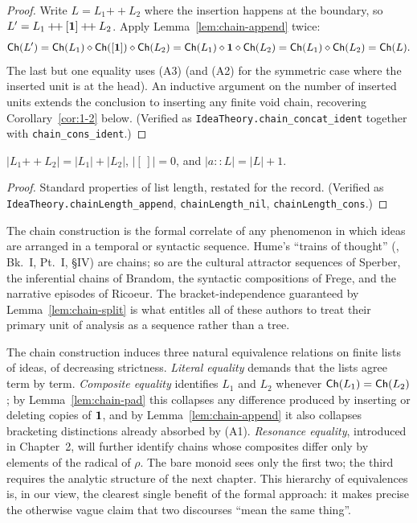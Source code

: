 \begin{proof}
Write $L = L_1 \mathbin{+\!+} L_2$ where the insertion happens at the
boundary, so $L' = L_1 \mathbin{+\!+} [\mathbf{1}] \mathbin{+\!+} L_2$.  Apply
Lemma~\ref{lem:chain-append} twice:
\[
\mathsf{Ch}(L') = \mathsf{Ch}(L_1) \mathbin{\diamond} \mathsf{Ch}([\mathbf{1}]) \mathbin{\diamond} \mathsf{Ch}(L_2)
= \mathsf{Ch}(L_1) \mathbin{\diamond} \mathbf{1} \mathbin{\diamond} \mathsf{Ch}(L_2)
= \mathsf{Ch}(L_1) \mathbin{\diamond} \mathsf{Ch}(L_2) = \mathsf{Ch}(L).
\]
The last but one equality uses (A3) (and (A2) for the symmetric case
where the inserted unit is at the head).  An inductive argument on the
number of inserted units extends the conclusion to inserting any finite
void chain, recovering Corollary~\ref{cor:1-2} below.  (Verified as
\texttt{IdeaTheory.chain\_concat\_ident} together with
\texttt{chain\_cons\_ident}.)
\end{proof}

\begin{lemma}\label{lem:chain-length}
$|L_1 \mathbin{+\!+} L_2| = |L_1| + |L_2|$, $|[\,]| = 0$, and
$|a :: L| = |L| + 1$.
\end{lemma}

\begin{proof}
Standard properties of list length, restated for the record.  (Verified as
\texttt{IdeaTheory.chainLength\_append}, \texttt{chainLength\_nil},
\texttt{chainLength\_cons}.)
\end{proof}

\begin{remark}\label{rem:chains-discourse}
The chain construction is the formal correlate of any phenomenon in
which ideas are arranged in a temporal or syntactic sequence.  Hume's
``trains of thought'' (\cite{Hume1739}, Bk.~I, Pt.~I, \S IV) are chains;
so are the cultural attractor sequences of Sperber, the inferential
chains of Brandom, the syntactic compositions of Frege, and the
narrative episodes of Ricoeur.  The bracket-independence guaranteed by
Lemma~\ref{lem:chain-split} is what entitles all of these authors to
treat their primary unit of analysis as a sequence rather than a tree.
\end{remark}

\begin{remark}
The chain construction induces three natural equivalence relations on
finite lists of ideas, of decreasing strictness.  \emph{Literal equality}
demands that the lists agree term by term.  \emph{Composite equality}
identifies $L_1$ and $L_2$ whenever $\mathsf{Ch}(L_1) = \mathsf{Ch}(L_2)$; by
Lemma~\ref{lem:chain-pad} this collapses any difference produced by
inserting or deleting copies of $\mathbf{1}$, and by
Lemma~\ref{lem:chain-append} it also collapses bracketing distinctions
already absorbed by (A1).  \emph{Resonance equality}, introduced in
Chapter~2, will further identify chains whose composites differ only by
elements of the radical of $\rho$.  The bare monoid sees only the first
two; the third requires the analytic structure of the next chapter.  This
hierarchy of equivalences is, in our view, the clearest single benefit of
the formal approach: it makes precise the otherwise vague claim that two
discourses ``mean the same thing''.
\end{remark}

